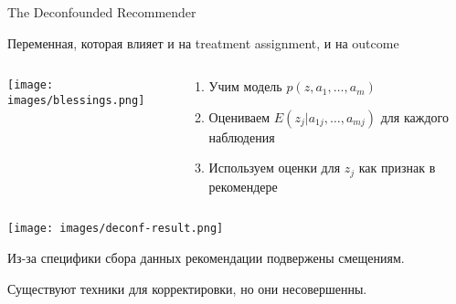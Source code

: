 \documentclass[11pt,aspectratio=169,handout]{beamer}
\begin{document}
\begin{frame}{The Deconfounded Recommender \cite{DECONF}}

\vfill

\begin{tcolorbox}[colback=gray!5,colframe=gray!80,title=Confounder]
Переменная, которая влияет и на treatment assignment, и на outcome
\end{tcolorbox}

\begin{columns}
\begin{column}{0.4\textwidth}
\begin{center}
\texttt{[image: images/blessings.png]}
\end{center}
\end{column}

\begin{column}{0.5\textwidth}
\begin{enumerate}
\item Учим модель $p(z, a_1, \ldots, a_m)$
\item Оцениваем $E(z_j | a_{1j}, \ldots, a_{mj})$ для каждого наблюдения
\item Используем оценки для $z_j$ как признак в рекомендере
\end{enumerate}
\end{column}
\end{columns}

\end{frame}

\begin{frame}

\begin{center}
\texttt{[image: images/deconf-result.png]}
\end{center}

\end{frame}

\begin{frame}

\begin{tcolorbox}[colback=info!5,colframe=info!80,title=]
Из-за специфики сбора данных рекомендации подвержены смещениям. 
\end{tcolorbox}
\begin{tcolorbox}[colback=info!5,colframe=info!80,title=]
Существуют техники для корректировки, но они несовершенны.
\end{tcolorbox}

\end{frame}
\end{document}
